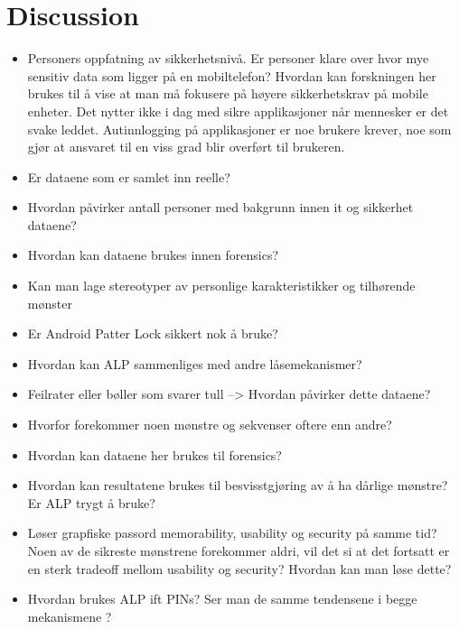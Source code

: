 \chapter{Discussion}\label{chap:discussion}

	\begin{itemize}
		\item Personers oppfatning av sikkerhetsnivå. Er personer klare over hvor mye sensitiv data som ligger på en mobiltelefon? Hvordan kan forskningen her brukes til å vise at man må fokusere på høyere sikkerhetskrav på mobile enheter. Det nytter ikke i dag med sikre applikasjoner når mennesker er det svake leddet. Autinnlogging på applikasjoner er noe brukere krever, noe som gjør at ansvaret til en viss grad blir overført til brukeren.
		\item Er dataene som er samlet inn reelle? 
		\item Hvordan påvirker antall personer med bakgrunn innen it og sikkerhet dataene?
		\item Hvordan kan dataene brukes innen forensics?
		\item Kan man lage stereotyper av personlige karakteristikker og tilhørende mønster
		\item Er Android Patter Lock sikkert nok å bruke?
		\item Hvordan kan ALP sammenliges med andre låsemekanismer?
		\item Feilrater eller bøller som svarer tull --> Hvordan påvirker dette dataene?
		\item Hvorfor forekommer noen mønstre og sekvenser oftere enn andre?
		\item Hvordan kan dataene her brukes til forensics?
		\item Hvordan kan resultatene brukes til besvisstgjøring av å ha dårlige mønstre? Er ALP trygt å bruke?
		\item Løser grapfiske passord memorability, usability og security på samme tid? Noen av de sikreste mønstrene forekommer aldri, vil det si at det fortsatt er en sterk tradeoff mellom usability og security? Hvordan kan man løse dette?
		\item Hvordan brukes ALP ift PINs? Ser man de samme tendensene i begge mekanismene ?
		
	\end{itemize}

